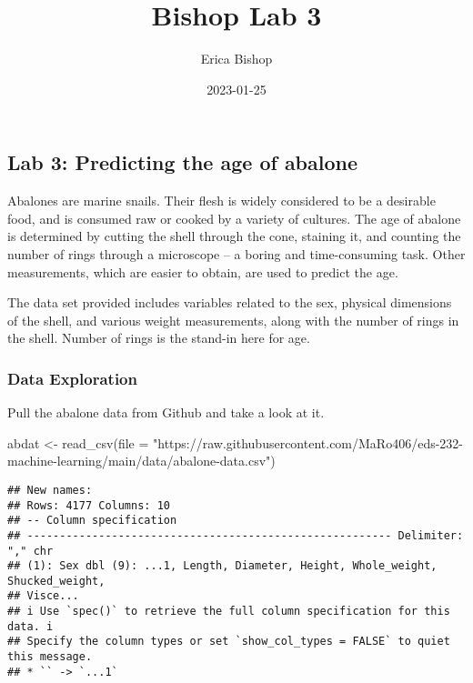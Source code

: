 \documentclass[
]{article}
\title{Bishop Lab 3}
\author{Erica Bishop}
\date{2023-01-25}
\newenvironment{Shaded}{\begin{snugshade}}{\end{snugshade}}
\newcommand{\AttributeTok}[1]{\textcolor[rgb]{0.77,0.63,0.00}{#1}}
\newcommand{\FunctionTok}[1]{\textcolor[rgb]{0.00,0.00,0.00}{#1}}
\newcommand{\NormalTok}[1]{#1}
\newcommand{\OtherTok}[1]{\textcolor[rgb]{0.56,0.35,0.01}{#1}}
\newcommand{\StringTok}[1]{\textcolor[rgb]{0.31,0.60,0.02}{#1}}
\begin{document}
\maketitle

\hypertarget{lab-3-predicting-the-age-of-abalone}{%
\subsection{Lab 3: Predicting the age of
abalone}\label{lab-3-predicting-the-age-of-abalone}}

Abalones are marine snails. Their flesh is widely considered to be a
desirable food, and is consumed raw or cooked by a variety of cultures.
The age of abalone is determined by cutting the shell through the cone,
staining it, and counting the number of rings through a microscope -- a
boring and time-consuming task. Other measurements, which are easier to
obtain, are used to predict the age.

The data set provided includes variables related to the sex, physical
dimensions of the shell, and various weight measurements, along with the
number of rings in the shell. Number of rings is the stand-in here for
age.

\hypertarget{data-exploration}{%
\subsubsection{Data Exploration}\label{data-exploration}}

Pull the abalone data from Github and take a look at it.

\begin{Shaded}
\begin{Highlighting}[]
\NormalTok{abdat }\OtherTok{\textless{}{-}} \FunctionTok{read\_csv}\NormalTok{(}\AttributeTok{file =} \StringTok{"https://raw.githubusercontent.com/MaRo406/eds{-}232{-}machine{-}learning/main/data/abalone{-}data.csv"}\NormalTok{)}
\end{Highlighting}
\end{Shaded}

\begin{verbatim}
## New names:
## Rows: 4177 Columns: 10
## -- Column specification
## -------------------------------------------------------- Delimiter: "," chr
## (1): Sex dbl (9): ...1, Length, Diameter, Height, Whole_weight, Shucked_weight,
## Visce...
## i Use `spec()` to retrieve the full column specification for this data. i
## Specify the column types or set `show_col_types = FALSE` to quiet this message.
## * `` -> `...1`
\end{verbatim}
\end{document}
